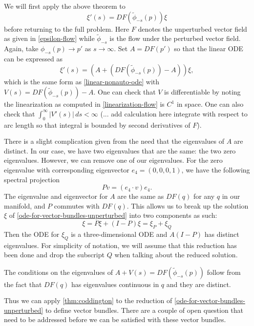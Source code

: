 We will first apply the above theorem to 
\begin{equation}\label{flow-for-tangent-vectors-unperturbed}
	\xi'(s) = DF(\tilde \phi_{-s}(p)) \xi
\end{equation}
before returning to the full problem. Here \(F\) denotes the unperturbed vector field as given in \cref{epsilon-flow} while \(\tilde\phi_{-s}\) is the flow under the perturbed vector field. Again, take \(\phi_{-s}(p) \to p'
\) as \(s\to \infty\). Set \(A = DF(p')\) so that the linear ODE can be expressed as
\begin{equation}\label{ode-for-vector-bundles-unperturbed}
	\xi'(s) = (A + (DF(\tilde \phi_{-s}(p)) - A)) \xi,
\end{equation}
which is the same form as \cref{linear-nonauto-ode} with \(V(s) = DF(\tilde \phi_{-s}(p)) - A\). One can check that \(V\) is differentiable by noting the linearization as computed in \cref{linearization-flow} is \(C^1\) in space. One can also check that \(\int_{0}^\infty |V'(s)|\, ds < \infty\) (... add calculation here integrate with respect to arc length so that integral is bounded by second derivatives of \(F\)).

There is a slight complication given from the need that the eigenvalues of \(A\) are distinct. In our case, we have two eigenvalues that are the same: the two zero eigenvalues. However, we can remove one of our eigenvalues. For the zero eigenvalue with corresponding eigenvector \(e_4 = (0, 0, 0, 1)\), we have the following spectral projection
\begin{equation}
	P v = (e_4 \cdot v) e_4.
\end{equation}
The eigenvalue and eigenvector for \(A\) are the same as \(DF(q)\) for any \(q\) in our manifold, and \(P\) commutes with \(DF(q)\). This allows us to break up the solution \(\xi\) of \cref{ode-for-vector-bundles-unperturbed} into two components as such:
\begin{equation}
	\xi = P\xi + (I-P)\xi = \xi_P + \xi_Q
\end{equation}
Then the ODE for \(\xi_Q\) is a three-dimensional ODE and \(A(I-P)\) has distinct eigenvalues. For simplicity of notation, we will assume that this reduction has been done and drop the subscript \(Q\) when talking about the reduced solution.

The conditions on the eigenvalues of \(A+V(s) = DF(\tilde\phi_{-s}(p))\) follow from the fact that \(DF(q)\) has eigenvalues continuous in \(q\) and they are distinct.

Thus we can apply \cref{thm:coddington} to the reduction of \cref{ode-for-vector-bundles-unperturbed} to define vector bundles. There are a couple of open question that need to be addressed before we can be satisfied with these vector bundles. 

